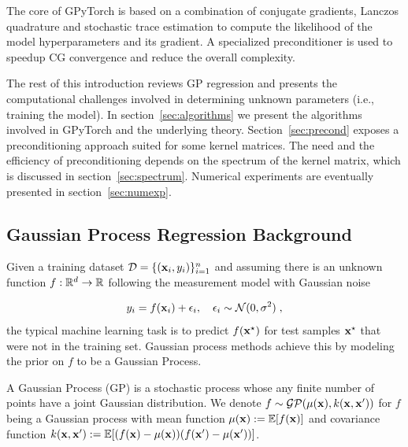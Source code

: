 \documentclass{article}
\begin{document}
The core of GPyTorch is based on a combination of conjugate gradients, Lanczos quadrature and stochastic trace estimation to compute the likelihood of the model hyperparameters and its gradient. A specialized preconditioner is used to speedup CG convergence and reduce the overall complexity.

The rest of this introduction reviews GP regression and presents the computational challenges involved in determining unknown parameters (i.e., training the model).
In section~\ref{sec:algorithms} we present the algorithms involved in GPyTorch and the underlying theory. 
Section~\ref{sec:precond} exposes a preconditioning approach suited for some kernel matrices. The need and the efficiency of preconditioning depends on the spectrum of the kernel matrix, which is discussed in section~\ref{sec:spectrum}.
Numerical experiments are eventually presented in section~\ref{sec:numexp}.


\subsection{Gaussian Process Regression Background}

Given a training dataset $\mathcal D = \{(\boldsymbol{\mathbf{x}}_i, y_i)\}_{i=1}^n$ and assuming there is an unknown function $f: \mathbb R^d \to \mathbb R$ following the measurement model with Gaussian noise

\begin{equation} \label{eq:measurement_model}
    y_i = f(\boldsymbol{\mathbf{x}}_i) + \epsilon_i, \quad \epsilon_i \sim \mathcal N(0, \sigma^2) \; ,
\end{equation}
%
the typical machine learning task is to predict $f(\boldsymbol{\mathbf{x}}^\star)$ for test samples $\boldsymbol{\mathbf{x}}^\star$ that were not in the training set.
Gaussian process methods achieve this by modeling the prior on $f$ to be a Gaussian Process.

\begin{definition}
A Gaussian Process (GP) is a stochastic process whose any finite number of points have a joint Gaussian distribution. We denote $f \sim \mathcal{GP}(\mu(\boldsymbol{\mathbf{x}}), k(\boldsymbol{\mathbf{x}}, \boldsymbol{\mathbf{x}}'))$ for $f$ being a Gaussian process with mean function $\mu(\boldsymbol{\mathbf{x}}) := \operatorname{\mathbb{E}}[f(\boldsymbol{\mathbf{x}})]$ and covariance function $k(\boldsymbol{\mathbf{x}}, \boldsymbol{\mathbf{x}}') := \operatorname{\mathbb{E}}[(f(\boldsymbol{\mathbf{x}})-\mu(\boldsymbol{\mathbf{x}}))  (f(\boldsymbol{\mathbf{x}}') - \mu(\boldsymbol{\mathbf{x}}'))]$.
\end{definition}
\end{document}
